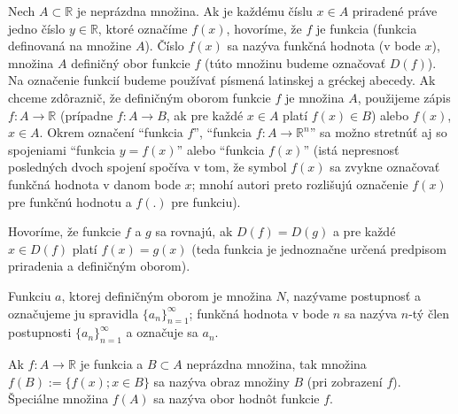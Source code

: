 Nech $A\subset \mathbb{R}$ je neprázdna množina. Ak je každému číslu $x\in A$
priradené práve jedno číslo $y\in\mathbb{R}$, ktoré označíme $f(x)$, hovoríme,
že $f$ je funkcia (funkcia definovaná na množine $A$). Číslo $f(x)$ sa nazýva
funkčná hodnota (v bode $x$), množina $A$ definičný obor funkcie $f$ (túto
množinu budeme označovať $D(f)$). Na označenie funkcií budeme používať písmená
latinskej a gréckej abecedy. Ak chceme zdôraznič, že definičným oborom funkcie
$f$ je množina $A$, použijeme zápis $f:A \rightarrow \mathbb{R}$ (prípadne $f:A
\rightarrow B$, ak pre každé $x\in A$ platí $f(x)\in B$) alebo $f(x)$, $x\in A$.
Okrem označení \enquote{funkcia $f$}, \enquote{funkcia $f:A \rightarrow
\mathbb{R}^n$} sa možno stretnúť aj so spojeniami \enquote{funkcia $y=f(x)$}
alebo \enquote{funkcia $f(x)$} (istá nepresnosť posledných dvoch spojení spočíva
v tom, že symbol $f(x)$ sa zvykne označovať funkčná hodnota v danom bode $x$;
mnohí autori preto rozlišujú označenie $f(x)$ pre funkčnú hodnotu a $f(.)$ pre
funkciu).

Hovoríme, že funkcie $f$ a $g$ sa rovnajú, ak $D(f)=D(g)$ a pre každé $x\in
D(f)$ platí $f(x)=g(x)$ (teda funkcia je jednoznačne určená predpisom
priradenia a definičným oborom).

Funkciu $a$, ktorej definičným oborom je množina $N$, nazývame postupnosť a
označujeme ju spravidla $\{a_n\}_{n=1}^\infty$; funkčná hodnota v bode $n$ sa
nazýva $n$-tý člen postupnosti $\{a_n\}_{n=1}^\infty$ a označuje sa $a_n$.

Ak $f:A \rightarrow \mathbb{R}$ je funkcia a $B \subset A$ neprázdna množina,
tak množina $f(B):=\{f(x);x\in B \}$ sa nazýva obraz množiny $B$ (pri zobrazení
$f$). Špeciálne množina $f(A)$ sa nazýva obor hodnôt funkcie $f$.
